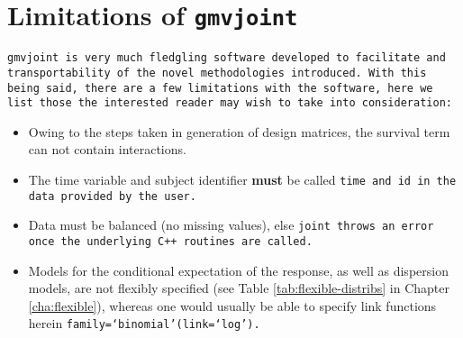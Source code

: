 \section{Limitations of \tt{gmvjoint}}\label{sec:appendix-gmvjoint-limitations}
\tt{gmvjoint} is very much fledgling software developed to facilitate and transportability of the novel methodologies introduced. With this being said, there are a few limitations with the software, here we list those the interested reader may wish to take into consideration:
\begin{itemize}
    \item Owing to the steps taken in generation of design matrices, the survival term can not contain interactions.
    \item The time variable and subject identifier \textbf{must} be called \tt{time} and \tt{id} in the \tt{data} provided by the user.
    \item Data must be balanced (\ie no missing values), else \tt{joint} throws an error once the underlying \tt{C++} routines are called.
    \item Models for the conditional expectation of the response, as well as dispersion models, are not flexibly specified (see Table \ref{tab:flexible-distribs} in Chapter \ref{cha:flexible}), whereas one would usually be able to specify link functions herein \eg \tt{family=`binomial'(link=`log')}.
\end{itemize}

